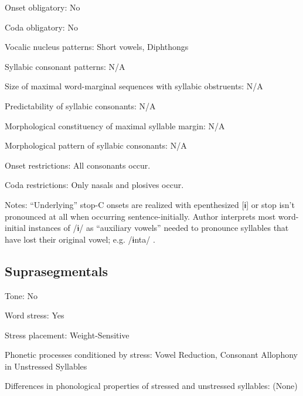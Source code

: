 {\begin{appendixdesc}
\item[Onset obligatory:] No

\item[Coda obligatory:] No

\item[Vocalic nucleus patterns:] Short vowels, Diphthongs

\item[Syllabic consonant patterns:] N/A

\item[Size of maximal word-marginal sequences with syllabic obstruents:] N/A

\item[Predictability of syllabic consonants:] N/A

\item[Morphological constituency of maximal syllable margin:] N/A

\item[Morphological pattern of syllabic consonants:] N/A

\item[Onset restrictions:] All consonants occur.

\item[Coda restrictions:] Only nasals and plosives occur.

\item[Notes:] “Underlying” stop-C onsets are realized with epenthesized [ɨ] or stop isn’t pronounced at all when occurring sentence-initially. Author interprets most word-initial instances of /ɨ/ as “auxiliary vowels” needed to pronounce syllables that have lost their original vowel; e.g. /ɨnta/ \citep[26]{Courtz2008}.
\end{appendixdesc}
\subsection*{Suprasegmentals}
\begin{appendixdesc}
\item[Tone:] No

\item[Word stress:] Yes

\item[Stress placement:] Weight-Sensitive

\item[Phonetic processes conditioned by stress:] Vowel Reduction, Consonant Allophony in Unstressed Syllables

\item[Differences in phonological properties of stressed and unstressed syllables:] (None)


\end{appendixdesc}}
